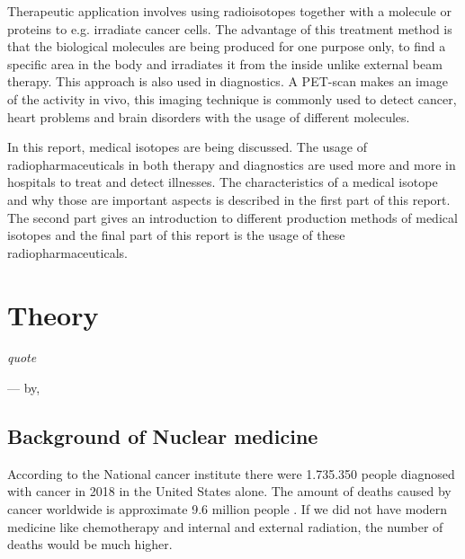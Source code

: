 \documentclass[twoside,english]{uiofysmaster/uiofysmaster}
\begin{document}
Therapeutic application involves using radioisotopes together with a molecule or proteins to e.g. irradiate cancer cells. The advantage of this treatment method is that the biological molecules are being produced for one purpose only, to find a specific area in the body and irradiates it from the inside unlike external beam therapy. This approach is also used in diagnostics. A PET-scan makes an image of the activity in vivo, this imaging technique is commonly used to detect cancer, heart problems and brain disorders with the usage of different molecules.


In this report, medical isotopes are being discussed. The usage of radiopharmaceuticals in both therapy and diagnostics are used more and more in hospitals to treat and detect illnesses. The characteristics of a medical isotope and why those are important aspects is described in the first part of this report. The second part gives an introduction to different production methods of medical isotopes and the final part of this report is the usage of these radiopharmaceuticals.  




\chapter{Theory}
\label{ch: beyond}

\epigraph{\itshape quote}{--- \textup{by}, }
 


\section{Background of Nuclear medicine}
\label{sec:Background}

According to the National cancer institute \cite{history_medicine} there were 1.735.350 people diagnosed with cancer in 2018 in the United States alone. The amount of deaths caused by cancer worldwide is approximate 9.6 million people \cite{WHO}. If we did not have modern medicine like chemotherapy and internal and external radiation, the number of deaths would be much higher. 
\end{document}
